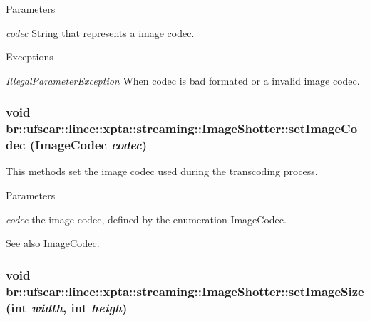 \begin{DoxyParams}{Parameters}
\item[{\em codec}]String that represents a image codec. \end{DoxyParams}

\begin{DoxyExceptions}{Exceptions}
\item[{\em IllegalParameterException}]When codec is bad formated or a invalid image codec. \end{DoxyExceptions}
\hypertarget{classbr_1_1ufscar_1_1lince_1_1xpta_1_1streaming_1_1ImageShotter_aaf80d398d7f9a939760cf00c02f576d2}{
\subsubsection[{setImageCodec}]{\setlength{\rightskip}{0pt plus 5cm}void br::ufscar::lince::xpta::streaming::ImageShotter::setImageCodec ({\bf ImageCodec} {\em codec})}}
\label{classbr_1_1ufscar_1_1lince_1_1xpta_1_1streaming_1_1ImageShotter_aaf80d398d7f9a939760cf00c02f576d2}


This methods set the image codec used during the transcoding process. 


\begin{DoxyParams}{Parameters}
\item[{\em codec}]the image codec, defined by the enumeration ImageCodec. \end{DoxyParams}
\begin{DoxySeeAlso}{See also}
\hyperlink{namespacebr_1_1ufscar_1_1lince_1_1xpta_1_1streaming_a2b9d08b18e23472bf55daa690c56169e}{ImageCodec}. 
\end{DoxySeeAlso}
\hypertarget{classbr_1_1ufscar_1_1lince_1_1xpta_1_1streaming_1_1ImageShotter_ab5aeb865dbfd30d615678be2ef0b614b}{
\subsubsection[{setImageSize}]{\setlength{\rightskip}{0pt plus 5cm}void br::ufscar::lince::xpta::streaming::ImageShotter::setImageSize (int {\em width}, \/  int {\em heigh})}}
\label{classbr_1_1ufscar_1_1lince_1_1xpta_1_1streaming_1_1ImageShotter_ab5aeb865dbfd30d615678be2ef0b614b}



